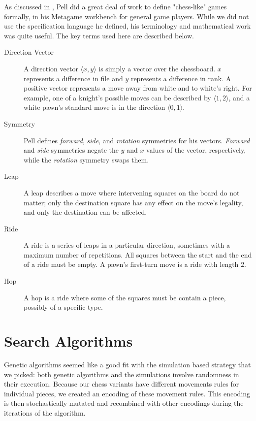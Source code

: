 \documentclass[11pt,letterpaper]{article}
\begin{document}
As discussed in \cite{agd1}, Pell \cite{metagame} did a great deal of work to
define "chess-like" games formally, in his Metagame workbench for general game
players. While we did not use the specification language he defined, his
terminology and mathematical work was quite useful. The key terms used here are
described below.

\begin{description}
   \item [Direction Vector] A direction vector \(\langle x,y \rangle\) is simply
      a vector over the chessboard. \(x\) represents a difference in file and
      \(y\) represents a difference in rank. A positive vector represents a move
      away from white and to white's right. For example, one of a knight's
      possible moves can be described by \(\langle 1,2 \rangle\), and a white
      pawn's standard move is in the direction \(\langle 0,1 \rangle\).
   \item [Symmetry] Pell defines \textit{forward}, \textit{side}, and
      \textit{rotation} symmetries for his vectors. \textit{Forward} and
      \textit{side} symmetries negate the \(y\) and \(x\) values of the vector,
      respectively, while the \textit{rotation} symmetry swaps them.
   \item [Leap] A leap describes a move where intervening squares on the board
      do not matter; only the destination square has any effect on the move's
      legality, and only the destination can be affected.
   \item [Ride] A ride is a series of leaps in a particular direction, sometimes
      with a maximum number of repetitions. All squares between the start and
      the end of a ride must be empty. A pawn's first-turn move is a ride with
      length \(2\).
   \item [Hop] A hop is a ride where some of the squares must be contain a
      piece, possibly of a specific type.
\end{description}

\section{Search Algorithms}
Genetic algorithms seemed like a good fit with the simulation based strategy that we picked: both genetic algorithms and the simulations involve randomness in their execution. Because our chess variants have different movements rules for individual pieces, we created an encoding of these movement rules. This encoding is then stochastically mutated and recombined with other encodings during the iterations of the algorithm.
\end{document}
